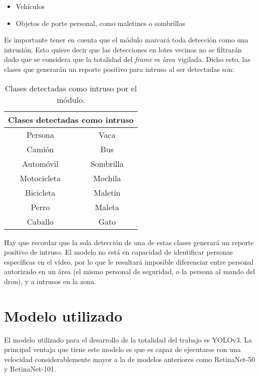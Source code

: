 \begin{itemize}
	\item Vehículos
	\item Objetos de porte personal, como maletines o sombrillas
\end{itemize}

Es importante tener en cuenta que el módulo marcará toda detección como una intrusión. Esto quiere decir que las detecciones en lotes vecinos no se filtrarán dado que se considera que la totalidad del \textit{frame} es área vigilada. Dicho esto, las clases que generarán un reporte positivo para intruso al ser detectadas son:

\begin{table}[]
\centering
\caption{Clases detectadas como intruso por el módulo.}
\label{definicion-intruso}
\begin{tabular}{cc}
\hline
\multicolumn{2}{c}{\textbf{Clases detectadas como intruso}} \\ \hline
Persona                   & Vaca                   \\
Camión                    & Bus                    \\
Automóvil                 & Sombrilla              \\
Motocicleta               & Mochila                \\
Bicicleta                 & Maletín                \\
Perro                     & Maleta                 \\
Caballo                   & Gato                   \\ \hline
\end{tabular}
\end{table}

\pagebreak

Hay que recordar que la sola detección de una de estas clases generará un reporte positivo de intruso. El modelo no está en capacidad de identificar personas específicas en el vídeo, por lo que le resultará imposible diferenciar entre personal autorizado en un área (el mismo personal de seguridad, o la persona al mando del dron), y a intrusos en la zona. 


\section{Modelo utilizado}

El modelo utilizado para el desarrollo de la totalidad del trabajo es YOLOv3. La principal ventaja que tiene este modelo es que es capaz de ejecutarse con una velocidad considerablemente mayor a la de modelos anteriores como RetinaNet-50 y RetinaNet-101. 

